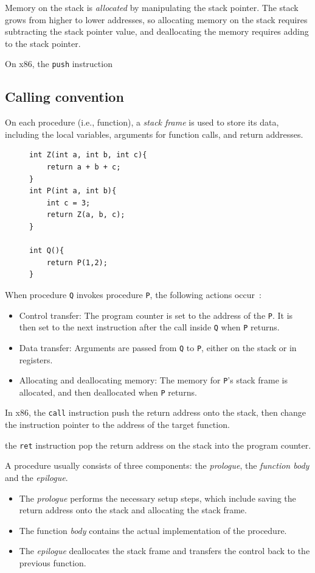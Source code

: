 \documentclass[11pt]{memoir}
\begin{document}
Memory on the stack is \emph{allocated} by manipulating the stack pointer.
The stack grows from higher to lower addresses, so allocating memory on the stack requires subtracting the stack pointer value, and deallocating the memory requires adding to the stack pointer. 

On x86, the \texttt{push} instruction 

\subsection{Calling convention}
On each procedure (i.e., function), a \emph{stack frame} is used to store its data, including the local variables, arguments for function calls, and return addresses.
\begin{figure}
\begin{verbatim}
int Z(int a, int b, int c){
    return a + b + c;
}
int P(int a, int b){
    int c = 3;
    return Z(a, b, c);
}

int Q(){
    return P(1,2);
}
\end{verbatim}
\label{lst:}
\end{figure}


When procedure \texttt{Q} invokes procedure \texttt{P}, the following actions occur~\cite{bryant2016computer}:
\begin{itemize}
    \item Control transfer: The program counter is set to the address of the \texttt{P}. It is then set to the next instruction after the call inside \texttt{Q} when \texttt{P} returns.
    \item Data transfer: Arguments are passed from \texttt{Q} to \texttt{P}, either on the stack or in registers.
    \item Allocating and deallocating memory: The memory for \texttt{P}'s stack frame is allocated, and then deallocated when \texttt{P} returns.
\end{itemize}
In x86, the \texttt{call} instruction push the return address onto the stack, then change the instruction pointer to the address of the target function.

the \texttt{ret} instruction pop the return address on the stack into the program counter.

A procedure usually consists of three components: the \emph{prologue}, the \emph{function body} and the \emph{epilogue}.
\begin{itemize}
    \item The \emph{prologue} performs the necessary setup steps, which include saving the return address onto the stack and allocating the stack frame.
    \item The function \emph{body} contains the actual implementation of the procedure.
    \item The \emph{epilogue} deallocates the stack frame and transfers the control back to the previous function.
\end{itemize}
\end{document}
